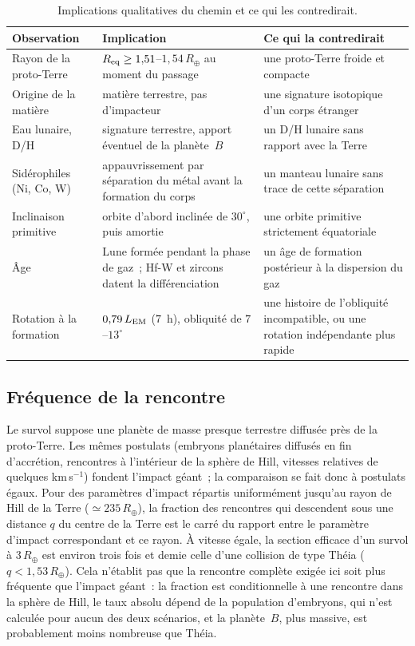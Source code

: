\documentclass[11pt,a4paper]{article}
\newcommand{\Rt}{\ensuremath{R_\oplus}}
\newcommand{\LEM}{\ensuremath{L_{\rm EM}}}
\newcommand{\Req}{\ensuremath{R_{\rm eq}}}
\begin{document}
\begin{table}[htbp]
\centering
\caption{Implications qualitatives du chemin et ce qui les contredirait.\label{tab:tests}}
\small
\begin{tabular}{>{\raggedright\arraybackslash}p{3.6cm}>{\raggedright\arraybackslash}p{5.6cm}>{\raggedright\arraybackslash}p{5.6cm}}
\toprule
Observation & Implication & Ce qui la contredirait \\
\midrule
Rayon de la proto-Terre & $\Req\ge1{,}51$--$1{,}54\,\Rt$ au moment du passage & une proto-Terre froide et compacte \\
Origine de la matière & matière terrestre, pas d'impacteur & une signature isotopique d'un corps étranger \\
Eau lunaire, D/H & signature terrestre, apport éventuel de la planète~$B$ & un D/H lunaire sans rapport avec la Terre \\
Sidérophiles (Ni, Co, W) & appauvrissement par séparation du métal avant la formation du corps & un manteau lunaire sans trace de cette séparation \\
Inclinaison primitive & orbite d'abord inclinée de $30^\circ$, puis amortie & une orbite primitive strictement équatoriale \\
Âge & Lune formée pendant la phase de gaz~; Hf-W et zircons datent la différenciation & un âge de formation postérieur à la dispersion du gaz \\
Rotation à la formation & $0{,}79\,\LEM$ ($7$~h), obliquité de $7$--$13^\circ$ & une histoire de l'obliquité incompatible, ou une rotation indépendante plus rapide \\
\bottomrule
\end{tabular}
\end{table}

\subsection{Fréquence de la rencontre}

Le survol suppose une planète de masse presque terrestre diffusée près de la proto-Terre. Les mêmes postulats (embryons planétaires diffusés en fin d'accrétion, rencontres à l'intérieur de la sphère de Hill, vitesses relatives de quelques km\,s$^{-1}$) fondent l'impact géant~; la comparaison se fait donc à postulats égaux. Pour des paramètres d'impact répartis uniformément jusqu'au rayon de Hill de la Terre ($\simeq235\,\Rt$), la fraction des rencontres qui descendent sous une distance $q$ du centre de la Terre est le carré du rapport entre le paramètre d'impact correspondant et ce rayon. À vitesse égale, la section efficace d'un survol à $3\,\Rt$ est environ trois fois et demie celle d'une collision de type Théia ($q<1{,}53\,\Rt$). Cela n'établit pas que la rencontre complète exigée ici soit plus fréquente que l'impact géant~: la fraction est conditionnelle à une rencontre dans la sphère de Hill, le taux absolu dépend de la population d'embryons, qui n'est calculée pour aucun des deux scénarios, et la planète~$B$, plus massive, est probablement moins nombreuse que Théia.
\end{document}
